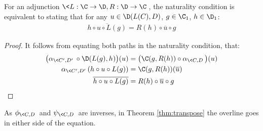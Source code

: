 \begin{theorem}
  For an adjunction $\<L: \C\to \D, R:\D\to \C\>$, the naturality condition is
  equivalent to stating that for any $u\in \D(L(C), D)$, $g \in \C_1$,
  $h\in \D_1$:
  \begin{align*}
    \overline{h\circ u \circ L(g)} = R(h) \circ \overline{u} \circ g
  \end{align*}

  \begin{proof}
    It follows from equating both paths in the naturality condition, that:
    \[
      \begin{aligned}
      \big(\alpha_{\<C', D'\>} \circ \D(L(g), h)\big)(u)
        &= \big(\C(g, R(h)) \circ \alpha_{\<C, D\>}\big)(u)\\
      \alpha_{\<C', D'\>}(h\circ u \circ L(g))
        &= \C(g, R(h))(\overline{u})\\
      \overline{h\circ u \circ L(g)}
        &= R(h) \circ \overline{u} \circ g
      \end{aligned}
    \]
  \end{proof}
  \vspace{-1.5\baselineskip}
\end{theorem}

\begin{remark}
  As $\phi_{\<C, D\>}$ and $\psi_{\<C, D\>}$ are inverses, in Theorem
  \ref{thm:transpose} the overline goes in either side of the equation.
\end{remark}

